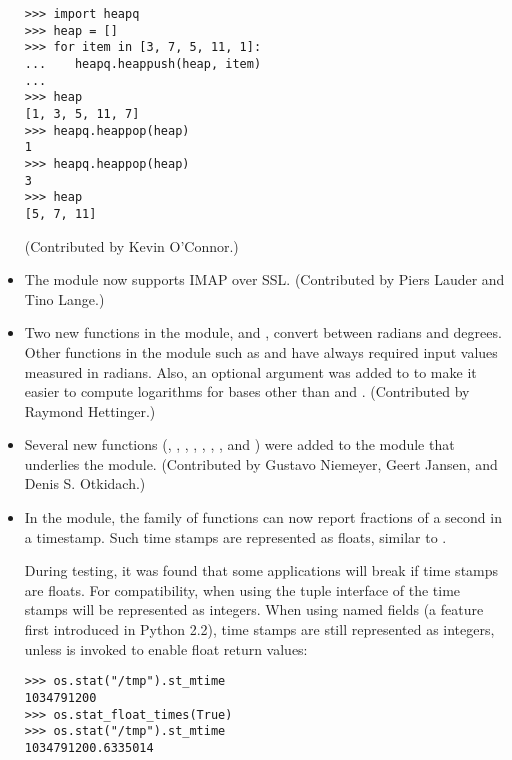 \documentclass{howto}
\begin{document}
\begin{itemize}
\begin{verbatim}
>>> import heapq
>>> heap = []
>>> for item in [3, 7, 5, 11, 1]:
...    heapq.heappush(heap, item)
...
>>> heap
[1, 3, 5, 11, 7]
>>> heapq.heappop(heap)
1
>>> heapq.heappop(heap)
3
>>> heap
[5, 7, 11]
\end{verbatim}

(Contributed by Kevin O'Connor.)

\item The  module now supports IMAP over SSL.
(Contributed by Piers Lauder and Tino Lange.)

\item Two new functions in the  module,
 and ,
convert between radians and degrees.  Other functions in the
 module such as  and
 have always required input values measured in
radians.  Also, an optional  argument was added to
 to make it easier to compute logarithms for
bases other than  and .  (Contributed by Raymond
Hettinger.)

\item Several new functions (, ,
, , , ,
, and ) were added to the
 module that underlies the  module.
(Contributed by Gustavo Niemeyer, Geert Jansen, and Denis S. Otkidach.)

\item In the  module, the  family of functions can now report
fractions of a second in a timestamp.  Such time stamps are
represented as floats, similar to .

During testing, it was found that some applications will break if time
stamps are floats.  For compatibility, when using the tuple interface
of the  time stamps will be represented as integers.
When using named fields (a feature first introduced in Python 2.2),
time stamps are still represented as integers, unless
 is invoked to enable float return
values:

\begin{verbatim}
>>> os.stat("/tmp").st_mtime
1034791200
>>> os.stat_float_times(True)
>>> os.stat("/tmp").st_mtime
1034791200.6335014
\end{verbatim}


\end{itemize}
\end{document}
